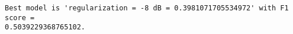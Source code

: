     \begin{Verbatim}[commandchars=\\\{\}]
Best model is 'regularization = -8 dB = 0.3981071705534972' with F1 score =
0.5039229368765102.
    \end{Verbatim}


